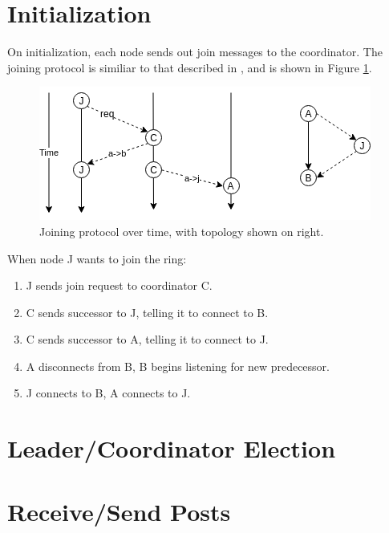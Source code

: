 \documentclass[12pt]{article}
\begin{document}
\section{Initialization}

On initialization, each node sends out join messages to the coordinator. The joining protocol is similiar to that described in \cite{join}, and is shown in Figure \ref{fig:join}.

\begin{figure}[!h]
\centering
  \centering
  \includegraphics[width=.6\linewidth]{images/join}
  \caption{Joining protocol over time, with topology shown on right.}
\label{fig:join}
\end{figure}

\noindent When node J wants to join the ring:
\begin{enumerate}
    \item J sends join request to coordinator C.
    \item C sends successor to J, telling it to connect to B.
    \item C sends successor to A, telling it to connect to J. 
    \item A disconnects from B, B begins listening for new predecessor.
    \item J connects to B, A connects to J.
\end{enumerate}

\section{Leader/Coordinator Election}

\section{Receive/Send Posts}



\end{document}

